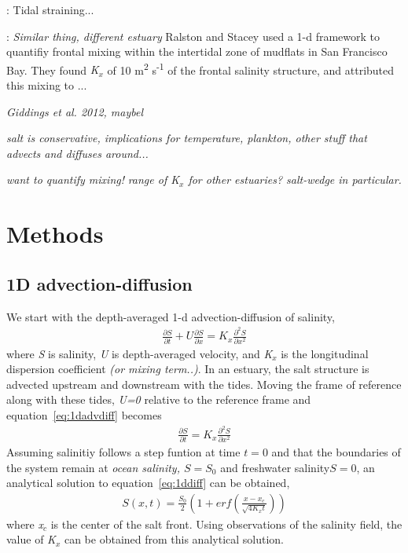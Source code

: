 \parencite{Simpson:1990aa}: Tidal straining... 

\parencite{Ralston:2005aa}: \emph{Similar thing, different estuary}
Ralston and Stacey \cite{Ralston:2005aa} used a 1-d framework to quantifiy frontal mixing within the intertidal zone of mudflats in San Francisco Bay. They found \emph{K$_x$} of 10 m\textsuperscript{2} s\textsuperscript{-1} of the frontal salinity structure, and attributed this mixing to ...

\emph{Giddings et al. 2012, maybel } 


\emph{salt is conservative, implications for temperature, plankton, other stuff that advects and diffuses around...}

\emph{want to quantify mixing!}
\emph{range of K$_x$ for other estuaries? salt-wedge in particular. }

\section{Methods} \label{sec:ch4methods}

\subsection{1D advection-diffusion} \label{ssec:1dadvdif}

We start with the depth-averaged 1-d advection-diffusion of salinity,
\begin{eqnarray}
\frac{\partial S}{\partial t} + U\frac{\partial S}{\partial x} = K_x\frac{\partial^2S}{\partial x^2} \label{eq:1dadvdiff}
\end{eqnarray}
where \emph{S} is salinity, \emph{U} is depth-averaged velocity, and \emph{K$_x$} is the longitudinal dispersion coefficient \emph{(or mixing term..)}. In an estuary, the salt structure is advected upstream and downstream with the tides. Moving the frame of reference along with these tides, \emph{U=0} relative to the reference frame and equation~\ref{eq:1dadvdiff} becomes
\begin{eqnarray}
\frac{\partial S}{\partial t} = K_x\frac{\partial^2S}{\partial x^2} \label{eq:1ddiff}
\end{eqnarray}
Assuming salinitiy follows a step funtion at time $t=0$ and that the boundaries of the system remain at \emph{ocean salinity, $S=S_0$} and freshwater salinity$S=0$, an analytical solution to equation~\ref{eq:1ddiff} can be obtained,
\begin{eqnarray}
S(x,t) = \frac{S_0}{2}\left(1+erf\left(\frac{x-x_c}{\sqrt{4K_xt}}\right)\right) \label{eq:S}
\end{eqnarray}
where \emph{x$_c$} is the center of the salt front. Using observations of the salinity field, the value of \emph{K$_x$} can be obtained from this analytical solution.


